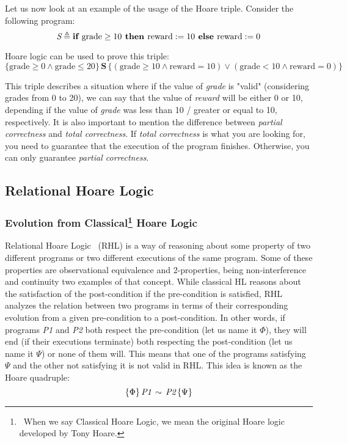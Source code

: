 Let us now look at an example of the usage of the Hoare triple. Consider the following program:
\[ 
\emph{S} \triangleq \textbf{if } \text{grade} \geq 10 \textbf{ then } \text{reward} := 10 \textbf{ else } \text{reward} := 0 
\]

Hoare logic can be used to prove this triple:
\[
\{ \text{grade} \geq 0 \land \text{grade} \leq 20 \} \, \textbf{S} \, \{ (\text{grade} \geq 10 \land \text{reward} = 10) \lor (\text{grade} < 10 \land \text{reward} = 0) \}
\]

This triple describes a situation where if the value of \emph{grade} is "valid" (considering grades from 0 to 20), we can say that the value of \emph{reward} will be either 0 or 10, depending if the value of \emph{grade} was less than 10 / greater or equal to 10, respectively.
It is also important to mention the difference between \emph{partial correctness} and \emph{total correctness}.
If \emph{total correctness} is what you are looking for, you need to guarantee that the execution of the program finishes.
Otherwise, you can only guarantee \emph{partial correctness}.


\subsection{Relational Hoare Logic} 
\label{sub:relational_hoare_logic}

\subsubsection{Evolution from Classical\protect\footnote{\ When we say Classical Hoare Logic, we mean the original Hoare logic developed by Tony Hoare.} Hoare Logic}
\label{sub:relational_hoare_logic_motivation}

Relational Hoare Logic~\cite{naumann2022thirtysevenyearsrelationalhoare, DBLP:conf/popl/Benton04} (RHL) is a way of reasoning about some property of two different programs or two different executions of the same program.
Some of these properties are observational equivalence and 2-properties, being non-interference and continuity two examples of that concept.
While classical HL reasons about the satisfaction of the post-condition if the pre-condition is satisfied, RHL analyzes the relation between two programs in terms of their corresponding evolution from a given pre-condition to a post-condition.
In other words, if programs \emph{P1} and \emph{P2} both respect the pre-condition (let us name it $\Phi$), they will end (if their executions terminate) both respecting the post-condition (let us name it $\Psi$) or none of them will.
This means that one of the programs satisfying $\Psi$ and the other not satisfying it is not valid in RHL.
This idea is known as the Hoare quadruple:
\[ \{\Phi\} \, \emph{P1} \, \sim \, \emph{P2} \, \{\Psi\} \]

